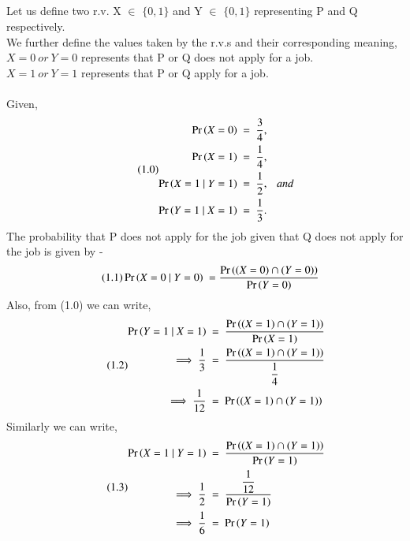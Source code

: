 \documentclass[journal,12pt,twocolumn]{IEEEtran}
\begin{document}
\subsection*{}
Let us define two r.v. X $\in$ $\{ 0, 1 \}$ and Y $\in$ $\{ 0, 1 \}$ representing P and Q respectively.\\

We further define the values taken by the r.v.s and their corresponding meaning,\\
$X = 0\ or\ Y = 0$ represents that P or Q does not apply for a job.\\
$X = 1\ or\ Y = 1$ represents that P or Q apply for a job.\\
\\Given, 
\begin{align}\tag{1.0}
    \begin{split}
        \Pr\left(X=0\right)\ &=\ \dfrac{3}{4},\\
        \Pr\left(X=1\right)\ &=\ \dfrac{1}{4},\\
        \Pr\left(X=1\ |\ Y=1\right)\ &=\ \dfrac{1}{2},\ \ \ and\\
        \Pr\left(Y=1\ |\ X=1\right)\ &=\ \dfrac{1}{3}.
    \end{split}
\end{align}
The probability that P does not apply for the job given that Q does not apply for the job is given by -\\
\begin{align}\tag{1.1}
    \Pr\left(X=0\ |\ Y=0\right)\ &= \dfrac{\Pr\left((X=0) \cap (Y=0)\right)}{\Pr\left(Y=0\right)}
\end{align}
Also, from (1.0) we can write,\\
\begin{align}\tag{1.2}
    \begin{split}
        \Pr\left(Y=1\ |\ X=1\right)\ &=\ \dfrac{\Pr\left((X=1) \cap (Y=1)\right)}{\Pr\left(X=1\right)}\\
        \implies
        \dfrac{1}{3}\ &=\ \dfrac{\Pr\left((X=1) \cap (Y=1)\right)}{\dfrac{1}{4}}\\
        \implies
        \dfrac{1}{12}\ &=\ \Pr\left((X=1) \cap (Y=1)\right)
    \end{split}
\end{align}
Similarly we can write,\\
\begin{align}\tag{1.3}
    \begin{split}
        \Pr\left(X=1\ |\ Y=1\right)\ &=\ \dfrac{\Pr\left((X=1) \cap (Y=1)\right)}{\Pr\left(Y=1\right)}\\
        \implies
        \dfrac{1}{2}\ &=\ \dfrac{\dfrac{1}{12}}{\Pr\left(Y=1\right)}\\
        \implies
        \dfrac{1}{6}\ &=\ \Pr\left(Y=1\right)
    \end{split}
\end{align}
\end{document}
